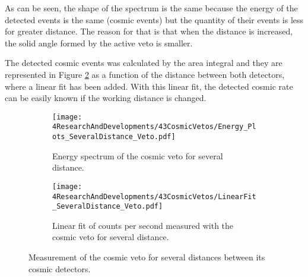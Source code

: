 
As can be seen, the shape of the spectrum is the same because the energy of the detected events is the same (cosmic events) but the quantity of their events is less for greater distance. The reason for that is that when the distance is increased, the solid angle formed by the active veto is smaller.

The detected cosmic events was calculated by the area integral and they are represented in Figure \ref{subfig:LinearFitSeveralDistanceVeto} as a function of the distance between both detectors, where a linear fit has been added. With this linear fit, the detected cosmic rate can be easily known if the working distance is changed. 



\begin{figure}
\centering
    \begin{subfigure}[b]{0.85\textwidth}
    \centering
    \texttt{[image: 4ResearchAndDevelopments/43CosmicVetos/Energy\_Plots\_SeveralDistance\_Veto.pdf]}  
    \caption{Energy spectrum of the cosmic veto for several distance.\label{subfig:EnergySpectrumsSeveralDistanceVeto}}
    \end{subfigure}
    \hfill
    \begin{subfigure}[b]{0.85\textwidth}
    \centering
    \texttt{[image: 4ResearchAndDevelopments/43CosmicVetos/LinearFit\_SeveralDistance\_Veto.pdf]}  
    \caption{Linear fit of counts per second measured with the cosmic veto for several distance.\label{subfig:LinearFitSeveralDistanceVeto}}
    \end{subfigure}
 \caption{Measurement of the cosmic veto for several distances between its cosmic detectors.}
 \label{fig:DistanceVeto}
\end{figure}

